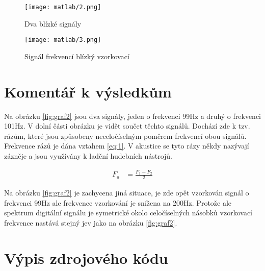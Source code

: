 \documentclass[11pt, a4paper]{article}
\begin{document}
        \begin{figure}[H]
            \centering
            \begin{minipage}{.5\textwidth}
                \centering
                \texttt{[image: matlab/2.png]}
                \caption{Dva blízké signály}
                \label{fig:graf2}
            \end{minipage}%
            \begin{minipage}{.5\textwidth}
                \centering
                \texttt{[image: matlab/3.png]}
                \caption{Signál frekvencí blízký vzorkovací}
                \label{fig:graf3}
            \end{minipage}
        \end{figure}
        
    \section{Komentář k výsledkům}
    
        Na obrázku \ref{fig:graf2} jsou dva signály, jeden o frekvenci 
        99Hz a druhý o frekvenci 101Hz. V dolní části obrázku je vidět 
        součet těchto signálů. Dochází zde k tzv. rázům, které jsou 
        způsobeny neceločíselným poměrem frekvencí obou signálů. 
        Frekvence rázů je dána vztahem \ref{eq:1}. V akustice se tyto 
        rázy někdy nazývají zázněje a jsou využívány k ladění hudebních 
        nástrojů.
        
        \begin{align}
            F_a &= \frac{F_1 - F_2}{2} \label{eq:1}
        \end{align}
        
        Na obrázku \ref{fig:graf2} je zachycena jiná situace, je zde 
        opět vzorkován signál o frekvenci 99Hz ale frekvence vzorkování 
        je snížena na 200Hz. Protože ale spektrum digitální signálu je 
        symetrické okolo celočíselných násobků vzorkovací frekvence 
        nastává stejný jev jako na obrázku \ref{fig:graf2}.
        
        \section{Výpis zdrojového kódu}
    
\end{document}
